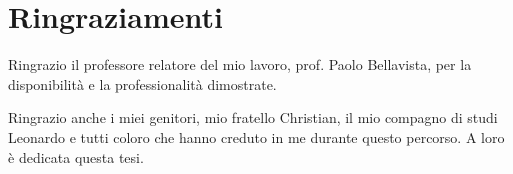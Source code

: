 \chapter*{Ringraziamenti}
Ringrazio il professore relatore del mio lavoro, prof. Paolo Bellavista, per la disponibilità e la professionalità dimostrate.

Ringrazio anche i miei genitori, mio fratello Christian, il mio compagno di studi Leonardo e tutti coloro che hanno creduto in me durante questo percorso.
A loro è dedicata questa tesi.